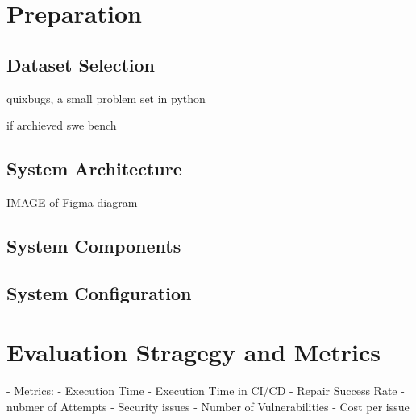 \section{Preparation}
\subsection{Dataset Selection}
quixbugs, a small problem set in python \cite{linQuixBugsMultilingualProgram2017}

if archieved swe bench \cite{jimenezSWEbenchCanLanguage2024}

\subsection{System Architecture}

IMAGE of Figma diagram

\subsection{System Components}
\subsection{System Configuration}

\section{Evaluation Stragegy and Metrics}
- Metrics:
- Execution Time
- Execution Time in CI/CD
- Repair Success Rate
- nubmer of Attempts
- Security issues
- Number of Vulnerabilities
- Cost per issue

